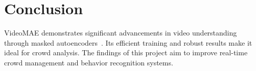 \documentclass[runningheads]{llncs}
\begin{document}
	\section{Conclusion}
	VideoMAE demonstrates significant advancements in video understanding through masked autoencoders~\cite{videomae_hf}. Its efficient training and robust results make it ideal for crowd analysis. The findings of this project aim to improve real-time crowd management and behavior recognition systems.
	
	
	
\end{document}
